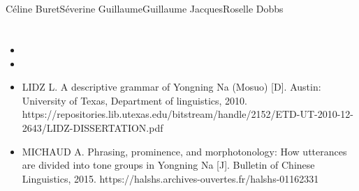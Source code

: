 	\section{ } \label{sec:thks}
	
	Céline BuretSéverine GuillaumeGuillaume JacquesRoselle Dobbs	

	\section{} \label{sec:refs}
	\begin{itemize}
		\item {}
		\item {}
		\item LIDZ L. A descriptive grammar of Yongning Na (Mosuo) [D]. Austin: University of Texas, Department of linguistics, 2010.
		https://repositories.lib.utexas.edu/bitstream/handle/2152/ETD-UT-2010-12-2643/LIDZ-DISSERTATION.pdf
		\item MICHAUD A. Phrasing, prominence, and morphotonology: How utterances are divided into tone groups in Yongning Na [J]. Bulletin of Chinese Linguistics, 2015. https://halshs.archives-ouvertes.fr/halshs-01162331
	\end{itemize}

\cleardoublepage
{}
\setcounter{page}{1}
 

	

